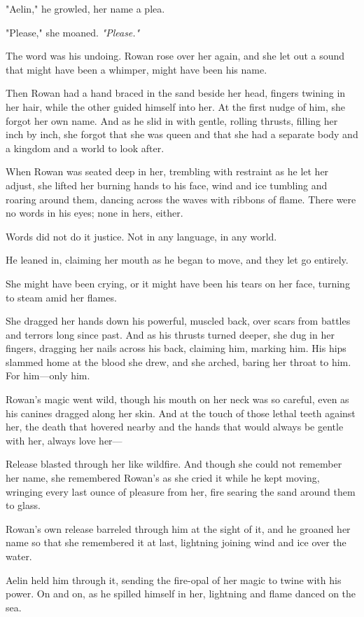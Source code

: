 "Aelin," he growled, her name a plea.

"Please," she moaned. \emph{"Please."}

The word was his undoing. Rowan rose over her again, and she let out a sound that might have been a whimper, might have been his name.

Then Rowan had a hand braced in the sand beside her head, fingers twining in her hair, while the other guided himself into her. At the first nudge of him, she forgot her own name. And as he slid in with gentle, rolling thrusts, filling her inch by inch, she forgot that she was queen and that she had a separate body and a kingdom and a world to look after.

When Rowan was seated deep in her, trembling with restraint as he let her adjust, she lifted her burning hands to his face, wind and ice tumbling and roaring around them, dancing across the waves with ribbons of flame. There were no words in his eyes; none in hers, either.

Words did not do it justice. Not in any language, in any world.

He leaned in, claiming her mouth as he began to move, and they let go entirely.

She might have been crying, or it might have been his tears on her face, turning to steam amid her flames.

She dragged her hands down his powerful, muscled back, over scars from battles and terrors long since past. And as his thrusts turned deeper, she dug in her fingers, dragging her nails across his back, claiming him, marking him. His hips slammed home at the blood she drew, and she arched, baring her throat to him. For him---only him.

Rowan's magic went wild, though his mouth on her neck was so careful, even as his canines dragged along her skin. And at the touch of those lethal teeth against her, the death that hovered nearby and the hands that would always be gentle with her, always love her---

Release blasted through her like wildfire. And though she could not remember her name, she remembered Rowan's as she cried it while he kept moving, wringing every last ounce of pleasure from her, fire searing the sand around them to glass.

Rowan's own release barreled through him at the sight of it, and he groaned her name so that she remembered it at last, lightning joining wind and ice over the water.

Aelin held him through it, sending the fire-opal of her magic to twine with his power. On and on, as he spilled himself in her, lightning and flame danced on the sea.

